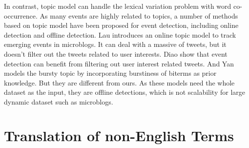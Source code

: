 \documentclass[11pt]{article}
\begin{document}
In contrast, topic model can handle the lexical variation problem with word co-occurrence\cite{blei2003latent}.
As many events are highly related to topics, a number of methods based on topic model have been proposed for event detection, including online detection and offline detection.
Lau\cite{lau2012line} introduces an online topic model to track emerging events in microblogs.
It can deal with a massive of tweets, but it doesn't filter out the tweets related to user interests.
Diao\cite{timeUserLDA2012finding}\cite{diao2013unified} show that event detection can benefit from filtering out user interest related tweets. 
And Yan\cite{Yan:2015wm} models the bursty topic by incorporating burstiness of biterms as prior knowledge.
But they are different from ours.
As these models need the whole dataset as the input, they are offline detections, which is not scalability for large dynamic dataset such as microblogs.

\section{Translation of non-English Terms}
\end{document}
